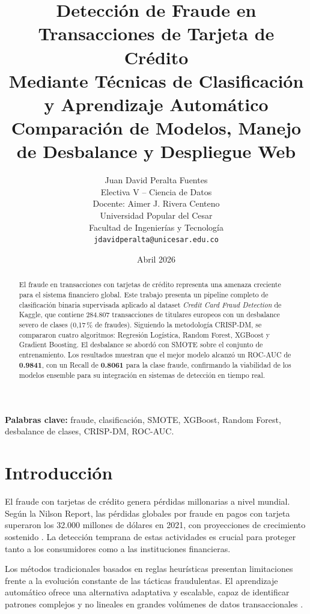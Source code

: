\documentclass[12pt, a4paper]{article}
\title{\textbf{Detección de Fraude en Transacciones de Tarjeta de Crédito\\
Mediante Técnicas de Clasificación y Aprendizaje Automático}\\[6pt]
\large Comparación de Modelos, Manejo de Desbalance y Despliegue Web}
\author{Juan David Peralta Fuentes\\
\small Electiva V -- Ciencia de Datos\\
\small Docente: Aimer J. Rivera Centeno\\
\small Universidad Popular del Cesar\\
\small Facultad de Ingenierías y Tecnología\\
\small \texttt{jdavidperalta@unicesar.edu.co}}
\date{Abril 2026}
\begin{document}
\maketitle

\begin{abstract}
El fraude en transacciones con tarjetas de crédito representa una amenaza
creciente para el sistema financiero global. Este trabajo presenta un
pipeline completo de clasificación binaria supervisada aplicado al dataset
\textit{Credit Card Fraud Detection} de Kaggle, que contiene 284.807
transacciones de titulares europeos con un desbalance severo de clases
(0{,}17\,\% de fraudes). Siguiendo la metodología CRISP-DM, se compararon
cuatro algoritmos: Regresión Logística, Random Forest, XGBoost y Gradient
Boosting. El desbalance se abordó con SMOTE sobre el conjunto de
entrenamiento. Los resultados muestran que el mejor modelo alcanzó un
ROC-AUC de \textbf{0.9841}, con un Recall de \textbf{0.8061}
para la clase fraude, confirmando la viabilidad de los modelos ensemble
para su integración en sistemas de detección en tiempo real.
\end{abstract}

\noindent\textbf{Palabras clave:} fraude, clasificación, SMOTE, XGBoost,
Random Forest, desbalance de clases, CRISP-DM, ROC-AUC.

\tableofcontents
\newpage

\section{Introducción}

El fraude con tarjetas de crédito genera pérdidas millonarias a nivel
mundial. Según la Nilson Report, las pérdidas globales por fraude en pagos
con tarjeta superaron los 32.000 millones de dólares en 2021, con
proyecciones de crecimiento sostenido \cite{nilson2021}. La detección
temprana de estas actividades es crucial para proteger tanto a
los consumidores como a las instituciones financieras.

Los métodos tradicionales basados en reglas heurísticas presentan
limitaciones frente a la evolución constante de las tácticas fraudulentas.
El aprendizaje automático ofrece una alternativa adaptativa y escalable,
capaz de identificar patrones complejos y no lineales en grandes volúmenes
de datos transaccionales \cite{dal2015learned}.
\end{document}
